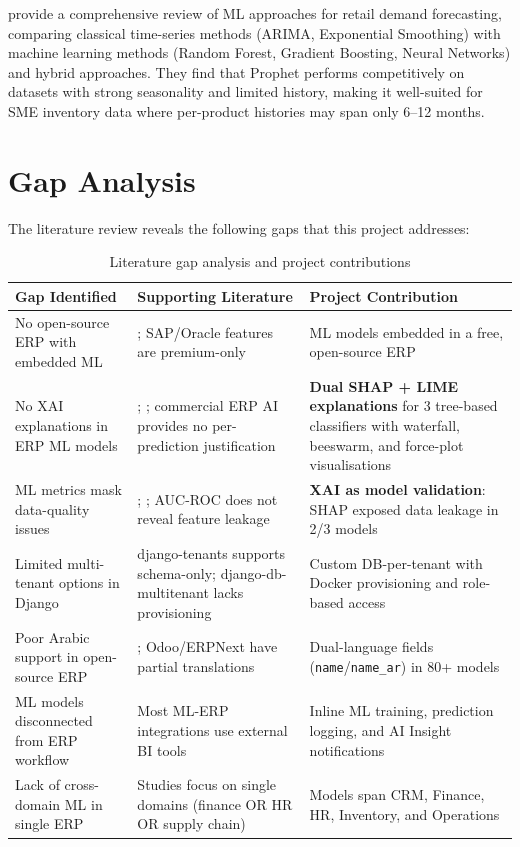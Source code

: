 \documentclass[12pt,a4paper]{report}
\begin{document}
\citet{fildes2022forecasting} provide a comprehensive review of ML approaches for retail demand forecasting, comparing classical time-series methods (ARIMA, Exponential Smoothing) with machine learning methods (Random Forest, Gradient Boosting, Neural Networks) and hybrid approaches. They find that Prophet performs competitively on datasets with strong seasonality and limited history, making it well-suited for SME inventory data where per-product histories may span only 6--12 months.


\section{Gap Analysis}
\label{sec:gap_analysis}

The literature review reveals the following gaps that this project addresses:

\begin{table}[H]
\centering
\caption{Literature gap analysis and project contributions}
\label{tab:gap_analysis}
\begin{tabularx}{\textwidth}{>{\raggedright\arraybackslash}X >{\raggedright\arraybackslash}X >{\raggedright\arraybackslash}X}
\toprule
\textbf{Gap Identified} & \textbf{Supporting Literature} & \textbf{Project Contribution} \\
\midrule
No open-source ERP with embedded ML & \citet{lee2020erp}; SAP/Oracle features are premium-only & 8 ML models embedded in a free, open-source ERP \\
\addlinespace
No XAI explanations in ERP ML models & \citet{arrieta2020explainable}; \citet{rudin2019stop}; commercial ERP AI provides no per-prediction justification & \textbf{Dual SHAP + LIME explanations} for 3 tree-based classifiers with waterfall, beeswarm, and force-plot visualisations \\
\addlinespace
ML metrics mask data-quality issues & \citet{lundberg2020local}; \citet{molnar2022interpretable}; AUC-ROC does not reveal feature leakage & \textbf{XAI as model validation}: SHAP exposed data leakage in 2/3 models \\
\addlinespace
Limited multi-tenant options in Django & django-tenants supports schema-only; django-db-multitenant lacks provisioning & Custom DB-per-tenant with Docker provisioning and role-based access \\
\addlinespace
Poor Arabic support in open-source ERP & \citet{alkraiji2020}; Odoo/ERPNext have partial translations & Dual-language fields (\texttt{name}/\texttt{name\_ar}) in 80+ models \\
\addlinespace
ML models disconnected from ERP workflow & Most ML-ERP integrations use external BI tools & Inline ML training, prediction logging, and AI Insight notifications \\
\addlinespace
Lack of cross-domain ML in single ERP & Studies focus on single domains (finance OR HR OR supply chain) & Models span CRM, Finance, HR, Inventory, and Operations \\
\bottomrule
\end{tabularx}
\end{table}
\end{document}
